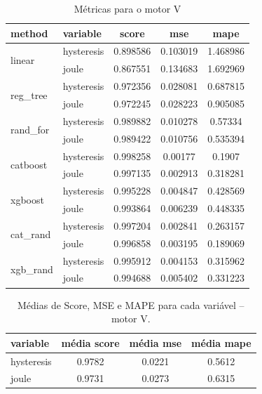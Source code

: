 \documentclass{article}
\begin{document}
\begin{table}[!htbp]
\centering
\caption{Métricas para o motor V}
\begin{tabular}{llccc}
\toprule
\textbf{method} & \textbf{variable} & \textbf{score} & \textbf{mse} & \textbf{mape} \\
\midrule
\multirow{2}{*}{linear} 
    & hysteresis & 0.898586 & 0.103019 & 1.468986 \\
    & joule      & 0.867551 & 0.134683 & 1.692969 \\
\midrule
\multirow{2}{*}{reg\_tree} 
    & hysteresis & 0.972356 & 0.028081 & 0.687815 \\
    & joule      & 0.972245 & 0.028223 & 0.905085 \\
\midrule
\multirow{2}{*}{rand\_for} 
    & hysteresis & 0.989882 & 0.010278 & 0.57334 \\
    & joule      & 0.989422 & 0.010756 & 0.535394 \\
\midrule
\multirow{2}{*}{catboost} 
    & hysteresis & 0.998258 & 0.00177 & 0.1907 \\
    & joule      & 0.997135 & 0.002913 & 0.318281 \\
\midrule
\multirow{2}{*}{xgboost} 
    & hysteresis & 0.995228 & 0.004847 & 0.428569 \\
    & joule      & 0.993864 & 0.006239 & 0.448335 \\
\midrule
\multirow{2}{*}{cat\_rand} 
    & hysteresis &0.997204 &	0.002841 &	0.263157 \\
    & joule      & 0.996858 &	0.003195 &	0.189069 \\
\midrule
\multirow{2}{*}{xgb\_rand} 
    & hysteresis & 0.995912 &	0.004153 &	0.315962 \\
    & joule      & 0.994688 &	0.005402 &	0.331223 \\
\bottomrule
\end{tabular}
\end{table}

\begin{table}[!htbp]
\centering
\caption{Médias de Score, MSE e MAPE para cada variável \--- motor V.}
\begin{tabular}{lccc}
\hline
\textbf{variable} & \textbf{média score} & \textbf{média mse} & \textbf{média mape} \\
\hline
hysteresis & 0.9782 & 0.0221 & 0.5612 \\
joule      & 0.9731 & 0.0273 & 0.6315 \\
\hline
\end{tabular}
\label{tab:medias_variaveis_V}
\end{table}
\end{document}
